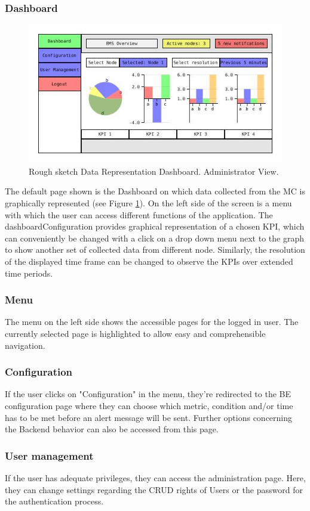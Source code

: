 \documentclass{scrreprt}
\begin{document}
\subsubsection{Dashboard}
\begin{figure}[h!]
	\centering
	\includegraphics[width=13cm]{Dashboard.jpg}
	\caption{Rough sketch Data Representation Dashboard. Administrator View.}
	\label{dashboardConfiguration}
\end{figure}
The default page shown is the Dashboard on which data collected from the MC is graphically represented (see Figure \ref{dashboardConfiguration}). On the left side of the screen is a menu with which the user can access different functions of the application. The dashboardConfiguration provides graphical representation of a chosen KPI, which can conveniently be changed with a click on a drop down menu next to the graph to show another set of collected data from different node. Similarly, the resolution of the displayed time frame can be changed to observe the KPIs over extended time periods.
\subsubsection{Menu}
The menu on the left side shows the accessible pages for the logged in user. The currently selected page is highlighted to allow easy and comprehensible navigation. 
\subsubsection{Configuration}
If the user clicks on "Configuration" in the menu, they're redirected to the BE configuration page where they can choose which metric, condition and/or time has to be met before an alert message will be sent. Further options concerning the Backend behavior can also be accessed  from this page.
\subsubsection{User management}
If the user has adequate privileges, they can access the administration page. Here, they can change settings regarding the CRUD rights of Users or the password for the authentication process.
\end{document}
